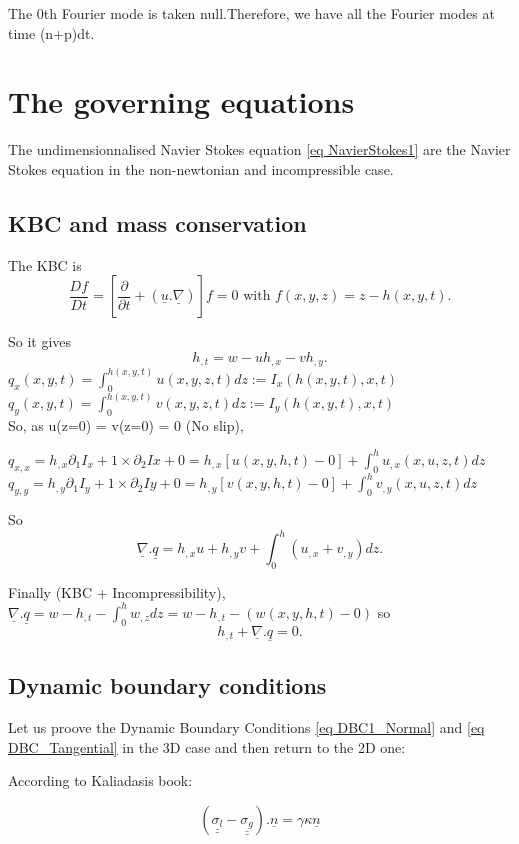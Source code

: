\documentclass[12pt]{article}
\begin{document}
The 0th Fourier mode is taken null.Therefore, we have all the Fourier modes at time (n+p)dt.

\section{The governing equations}
The undimensionnalised Navier Stokes  equation \ref{eq NavierStokes1} are the Navier Stokes equation in the non-newtonian and incompressible case. 

\subsection{KBC and mass conservation}
The KBC is $$\frac{Df}{Dt}=\left[\frac{\partial}{\partial t}+(\underline{u}.\underline{\nabla})\right]f=0 \text{  with } f(x, y, z) = z-h(x, y, t).$$

So it gives $$h_{,t}=w-uh_{,x}-vh_{,y}.$$
$q_{x}(x,y,t)=\int_{0}^{h(x, y, t)}u(x, y, z,t)dz:=I_x(h(x, y, t), x,t)$\\
$q_y(x, y, t)= \int_{0}^{h(x, y, t)}v(x, y, z,t)dz:=I_y(h(x, y, t), x,t)$\\

So, as u(z=0) = v(z=0) = 0 (No slip),

$q_{x,x}=h_{,x}\partial_1I_x+1\times\partial_2Ix+0= h_{,x}[u(x, y,h,t)-0] + \int_{0}^h u_{,x}(x, u, z, t)dz$\\
$q_{y,y}=h_{,y}\partial_1I_y+1\times\partial_2Iy+0= h_{,y}[v(x, y,h,t)-0] + \int_{0}^h v_{,y}(x, u, z, t)dz$

So $$\underline{\nabla}.\underline{q}=h_{,x}u+h_{,y}v+\int_{0}^h(u_{,x}+v_{,y})dz.$$

Finally (KBC + Incompressibility),
$\underline{\nabla}.\underline{q}=w-h_{,t} - \int_{0}^h w_{,z}dz = w-h_{,t}-(w(x, y, h, t) - 0)$ so $$h_{,t}+\underline{\nabla}.\underline{q}=0.$$
\subsection{Dynamic boundary conditions}
Let us proove the Dynamic Boundary Conditions \ref{eq DBC1_Normal} and \ref{eq DBC_Tangential} in the 3D case and then return to the 2D one:

According to Kaliadasis book: 

\begin{equation}\label{eq DBC Kaliadasis}(\underline{\underline{\sigma_l}}-\underline{\underline{\sigma_g}}).\underline{n}=\gamma\kappa\underline{n}
\end{equation}
\end{document}

